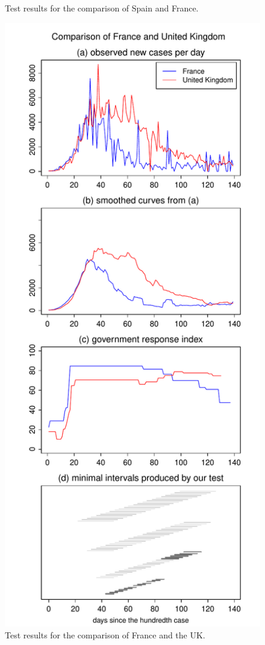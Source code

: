 \documentclass[a4paper,12pt]{article}
\numberwithin{equation}{section}
\begin{document}
\begin{figure}[p!]
\begin{minipage}[t]{0.49\textwidth}
\caption{Test results for the comparison of Spain and France.}
\end{minipage}
\hspace{0.25cm}
\begin{minipage}[t]{0.49\textwidth}
\includegraphics[width=\textwidth]{plots/FRA_vs_GBR}
\caption{Test results for the comparison of France and the UK.}
\end{minipage}
\end{figure}
\end{document}
